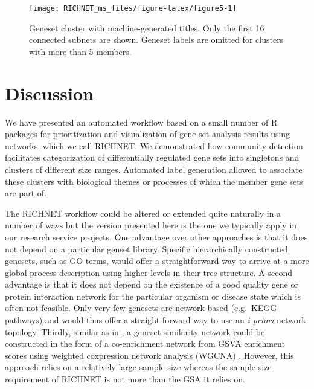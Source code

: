 \documentclass[9pt,a4paper,]{extarticle}
\begin{document}
\newpage 

\begin{figure}

{\centering \texttt{[image: RICHNET\_ms\_files/figure-latex/figure5-1]} 

}

\caption{Geneset cluster with machine-generated titles. Only the first 16 connected subnets are shown. Geneset labels are omitted for clusters with more than 5 members.}\label{fig:figure5}
\end{figure}\newpage 

\newpage 

\section{Discussion}\label{discussion}

We have presented an automated workflow based on a small number of R packages for prioritization and visualization of gene set analysis results using networks, which we call RICHNET. We demonstrated how community detection facilitates categorization of differentially regulated gene sets into singletons and clusters of different size ranges. Automated label generation allowed to associate these clusters with biological themes or processes of which the member gene sets are part of.

The RICHNET workflow could be altered or extended quite naturally in a number of ways but the version presented here is the one we typically apply in our research service projects. One advantage over other approaches is that it does not depend on a particular genset library. Specific hierarchically constructed genesets, such as GO terms, would offer a straightforward way to arrive at a more global process description using higher levels in their tree structure. A second advantage is that it does not depend on the existence of a good quality gene or protein interaction network for the particular organism or disease state which is often not feasible. Only very few genesets are network-based (e.g.~KEGG pathways) and would thus offer a straight-forward way to use an \emph{i priori} network topology. Thirdly, similar as in \citep{Thorsson2018}, a geneset similarity network could be constructed in the form of a co-enrichment network from GSVA enrichment scores \citep{Hanzelmann2013} using weighted coxpression network analysis (WGCNA) \citep{Langfelder2008}. However, this approach relies on a relatively large sample size whereas the sample size requirement of RICHNET is not more than the GSA it relies on.
\end{document}
